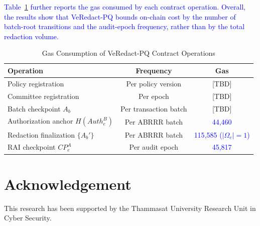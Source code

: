 \documentclass[lettersize,journal]{IEEEtran}
\newcommand{\chg}[1]{\textcolor{blue}{#1}}
\begin{document}
    \chg{Table~\ref{tab:gas} further reports the gas consumed by each contract
    operation. Overall, the results show that VeRedact-PQ bounds on-chain
    cost by the number of batch-root transitions and the audit-epoch
    frequency, rather than by the total redaction volume.}

    \begin{table}[t]
    \centering
    \caption{Gas Consumption of VeRedact-PQ Contract Operations}
    \label{tab:gas}
    \scriptsize
    \renewcommand{\arraystretch}{1.08}
    \setlength{\tabcolsep}{4pt}
    \begin{tabular}{lcc}
    \hline
    \textbf{Operation} & \textbf{Frequency} & \textbf{Gas} \\
    \hline
    Policy registration & Per policy version & [TBD] \\
    Committee registration & Per epoch & [TBD] \\
    Batch checkpoint $A_b$ & Per transaction batch & [TBD] \\
    Authorization anchor $H(Auth_e^B)$ & Per ABRRR batch & \chg{44{,}460} \\
    Redaction finalization $\{A_b'\}$ & Per ABRRR batch & \chg{115{,}585 ($|\Omega_e|=1$)} \\
    RAI checkpoint $CP_e^A$ & Per audit epoch & \chg{45{,}817} \\
    \hline
    \end{tabular}
    \end{table}
    \section{Acknowledgement}
    This research has been supported by the Thammasat University Research Unit in Cyber Security.
    
\end{document}
